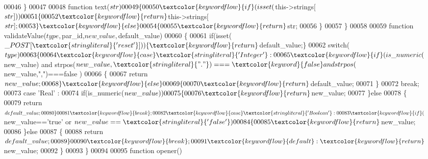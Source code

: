 \begin{DoxyCode}
00046   \}
00047   
00048   \textcolor{keyword}{function} text($str)
00049   \{
00050     \textcolor{keywordflow}{if}(isset($this->strings[$str]))
00051     \{
00052       \textcolor{keywordflow}{return} $this->strings[$str];
00053     \}\textcolor{keywordflow}{else}
00054     \{
00055       \textcolor{keywordflow}{return} $str;
00056     \}
00057   \}
00058 
00059   \textcolor{keyword}{function} validateValue($type,$par\_id,$new\_value,$default\_value)
00060   \{
00061     \textcolor{keywordflow}{if}(isset($\_POST[\textcolor{stringliteral}{'reset'}]))\{\textcolor{keywordflow}{return} $default\_value;\}
00062     \textcolor{keywordflow}{switch}($type)
00063     \{
00064       \textcolor{keywordflow}{case} \textcolor{stringliteral}{'Integer'}:
00065                     \textcolor{keywordflow}{if}(is\_numeric($new\_value) and strpos($new\_value,\textcolor{stringliteral}{"."})===\textcolor{keyword}{
      false} and strpos($new\_value,\textcolor{stringliteral}{","})===\textcolor{keyword}{false} )
00066                     \{
00067                       \textcolor{keywordflow}{return} $new\_value;
00068                     \}\textcolor{keywordflow}{else}
00069                     \{
00070                       \textcolor{keywordflow}{return} $default\_value;
00071                     \}
00072                     \textcolor{keywordflow}{break};
00073       \textcolor{keywordflow}{case} \textcolor{stringliteral}{'Real'}   :
00074                     \textcolor{keywordflow}{if}(is\_numeric($new\_value))
00075                     \{
00076                       \textcolor{keywordflow}{return} $new\_value;
00077                     \}\textcolor{keywordflow}{else}
00078                     \{
00079                       \textcolor{keywordflow}{return} $default\_value;
00080                     \}
00081                     \textcolor{keywordflow}{break};
00082       \textcolor{keywordflow}{case} \textcolor{stringliteral}{'Boolean'}:
00083                     \textcolor{keywordflow}{if}($new\_value==\textcolor{stringliteral}{'true'} or $new\_value==\textcolor{stringliteral}{'false'})
00084                     \{
00085                       \textcolor{keywordflow}{return} $new\_value;
00086                     \}\textcolor{keywordflow}{else}
00087                     \{
00088                       \textcolor{keywordflow}{return} $default\_value;
00089                     \}
00090                     \textcolor{keywordflow}{break};
00091       \textcolor{keywordflow}{default}: \textcolor{keywordflow}{return} $new\_value;
00092     \}
00093   \}
00094   
00095   \textcolor{keyword}{function} opener()

\end{DoxyCode}
